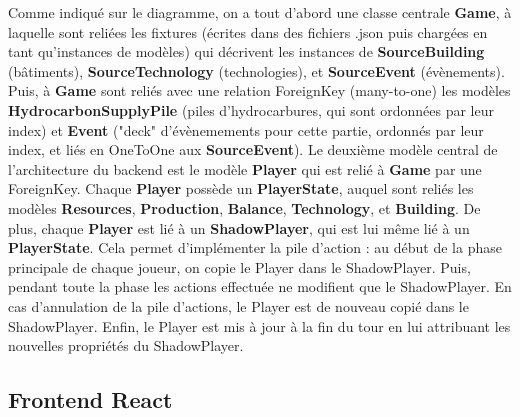 \documentclass[12pt,twoside,a4paper]{article}
\begin{document}
Comme indiqu\'e sur le diagramme, on a tout d'abord une classe centrale \textbf{Game}, \`a laquelle sont reli\'ees les fixtures (\'ecrites dans des fichiers .json puis charg\'ees en tant qu'instances de mod\`eles) qui d\'ecrivent les instances de \textbf{SourceBuilding} (b\^atiments), \textbf{SourceTechnology} (technologies), et \textbf{SourceEvent} (\'ev\`enements). Puis, \`a \textbf{Game} sont reli\'es avec une relation ForeignKey (many-to-one) les mod\`eles \textbf{HydrocarbonSupplyPile} (piles d'hydrocarbures, qui sont ordonn\'ees par leur index) et \textbf{Event} ("deck" d'\'ev\`enemements pour cette partie, ordonn\'es par leur index, et li\'es en OneToOne aux \textbf{SourceEvent}). Le deuxi\`eme mod\`ele central de l'architecture du backend est le mod\`ele \textbf{Player} qui est reli\'e \`a \textbf{Game} par une ForeignKey. Chaque \textbf{Player} poss\`ede un \textbf{PlayerState}, auquel sont reli\'es les mod\`eles \textbf{Resources}, \textbf{Production}, \textbf{Balance}, \textbf{Technology}, et \textbf{Building}. De plus, chaque \textbf{Player} est li\'e \`a un \textbf{ShadowPlayer}, qui est lui m\^eme li\'e \`a un \textbf{PlayerState}. Cela permet d'impl\'ementer la pile d'action : au d\'ebut de la phase principale de chaque joueur, on copie le Player dans le ShadowPlayer. Puis, pendant toute la phase les actions effectuée ne modifient que le ShadowPlayer. En cas d'annulation de la pile d'actions, le Player est de nouveau copié dans le ShadowPlayer. Enfin, le Player est mis \`a jour \`a la fin du tour en lui attribuant les nouvelles propriétés du ShadowPlayer.

\subsection{Frontend React}
\end{document}
